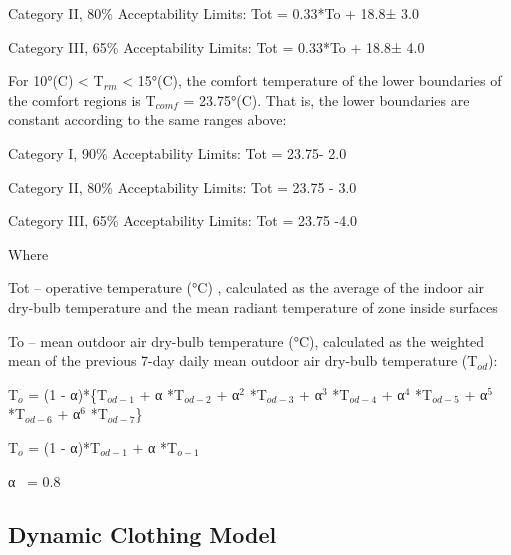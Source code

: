 Category II, 80\% Acceptability Limits: Tot = 0.33*To + 18.8± 3.0

Category III, 65\% Acceptability Limits: Tot = 0.33*To + 18.8± 4.0

For 10°(C) \textless{} T\(_{rm}\) \textless{} 15°(C), the comfort temperature of the lower boundaries of the comfort regions is T\(_{comf}\) = 23.75°(C). That is, the lower boundaries are constant according to the same ranges above:

Category I, 90\% Acceptability Limits: Tot = 23.75- 2.0

Category II, 80\% Acceptability Limits: Tot = 23.75 - 3.0

Category III, 65\% Acceptability Limits: Tot = 23.75 -4.0

Where

Tot -- operative temperature (°C) , calculated as the average of the indoor air dry-bulb temperature and the mean radiant temperature of zone inside surfaces

To -- mean outdoor air dry-bulb temperature (°C), calculated as the weighted mean of the previous 7-day daily mean outdoor air dry-bulb temperature (T\(_{od}\)):

T\(_{o}\) = (1 - α)*\{T\(_{od-1}\) + α *T\(_{od-2}\) + α\(^{2}\) *T\(_{od-3}\) + α\(^{3}\) *T\(_{od-4}\) + α\(^{4}\) *T\(_{od-5}\) + α\(^{5}\) *T\(_{od-6}\) + α\(^{6}\) *T\(_{od-7}\)\}

T\(_{o}\) = (1 - α)*T\(_{od-1}\) + α *T\(_{o-1}\)

α~ = 0.8

\subsection{Dynamic Clothing Model}\label{dynamic-clothing-model}

